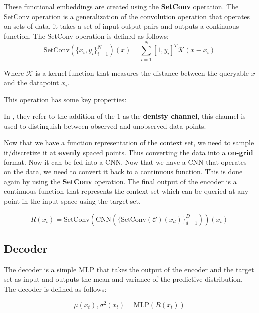 \documentclass[../../main.tex]{subfiles}
\begin{document}
These functional embeddings are created using the \textbf{SetConv} operation. The SetConv operation is a generalization of the convolution operation that operates on sets of data, it takes a set of input-output pairs and outputs a continuous function. The SetConv operation is defined as follows:
\begin{equation}
	\text{SetConv}(\{x_i, y_i\}_{i=1}^{N})(x) = \sum_{i=1}^{N} [1, y_i] ^ T \mathcal{K}(x - x_i)
\end{equation}

Where $\mathcal{K}$ is a kernel function that measures the distance between the queryable $x$ and the datapoint $x_i$.

This operation has some key properties:

In \cite{gordon2020convolutional}, they refer to the addition of the $1$ as the \textbf{denisty channel}, this channel is used to distinguish between observed and unobserved data points. 

Now that we have a function representation of the context set, we need to sample it/discretize it at \textbf{evenly} spaced points. Thus converting the data into a \textbf{on-grid} format. Now it can be fed into a CNN. Now that we have a CNN that operates on the data, we need to convert it back to a continuous function. This is done again by using the \textbf{SetConv} operation. The final output of the encoder is a continuous function that represents the context set which can be queried at any point in the input space using the target set.

\begin{equation}
	R(x_t) = \text{SetConv}(\text{CNN}(\{\text{SetConv}(\mathcal{C})(x_d)\}_{d=1}^{D}))(x_t)
\end{equation}

\subsection{Decoder}

The decoder is a simple MLP that takes the output of the encoder and the target set as input and outputs the mean and variance of the predictive distribution. The decoder is defined as follows:

\begin{equation}
	\mu(x_t), \sigma^2(x_t) = \text{MLP}(R(x_t))
\end{equation}


\ifSubfilesClassLoaded{%
    \printbibliography{}
}{} 
\end{document}
